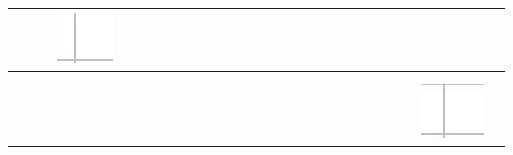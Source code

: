 \documentclass[10pt]{article}
\begin{document}
\begin{center}
\begin{tabular}{|c|c|c|c|c|c|c|c|c|c|c|c|c|c|c|c|c|c|c|c|c|c|c|c|c|c|c|}
 &  &  & \includegraphics[max width=\textwidth]{2024_11_21_7b5527312ea89ae66fd0g-24(2)}
 &  \\
\hline
 &  &  &  &  &  &  &  &  &  &  &  &  &  &  &  &  &  &  &  &  &  &  &  &  &  &  \\
\hline
 &  &  &  &  &  &  &  &  &  &  &  &  &  &  &  &  &  &  &  &  &  &  &  &  &  &  \\
\hline
 &  &  &  &  &  &  &  &  &  &  &  &  &  &  &  &  &  &  &  &  &  &  &  &  & \includegraphics[max width=\textwidth]{2024_11_21_7b5527312ea89ae66fd0g-24(6)}

\end{tabular}
\end{center}
\end{document}
